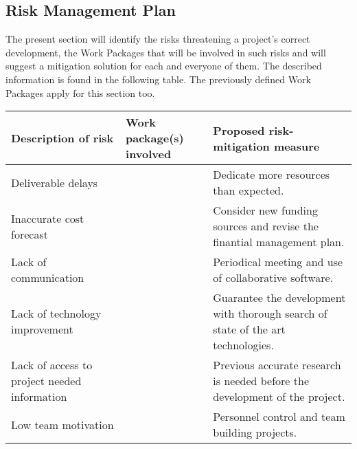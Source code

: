 \subsection{Risk Management Plan}

The present section will identify the risks threatening a project's correct development, the Work Packages that will be involved in such risks and will suggest a mitigation solution for each and everyone of them. The described information is found in the following table. The previously defined Work Packages apply for this section too.

\begin{longtable}[H]{p{4cm} p{4.7cm} p{5cm}}
	\toprule[2pt]
	
	\textbf{Description of risk} & \textbf{Work package(s) involved} & \textbf{Proposed risk-mitigation measure} \\
	
	\midrule[1.5pt] 
	\endhead
	
	Deliverable delays &  & Dedicate more resources than expected. \vspace{0.2cm} \\
	
	\midrule

	Inaccurate cost forecast &  & Consider new funding sources and revise the finantial management plan. \vspace{0.2cm} \\
	
	\midrule
	
	Lack of communication &  & Periodical meeting and use of collaborative software.  \vspace{0.2cm} \\

	\midrule

 	Lack of technology improvement &  & Guarantee the development with thorough search of state of the art technologies.  \vspace{0.2cm} \\
 	
 	\midrule
 	
 	Lack of access to project needed information &  & Previous accurate research is needed before the development of the project. \vspace{0.2cm} \\
 
 	\midrule

	Low team motivation &  & Personnel control and team building projects. \vspace{0.2cm} \\
 	

\end{longtable}
